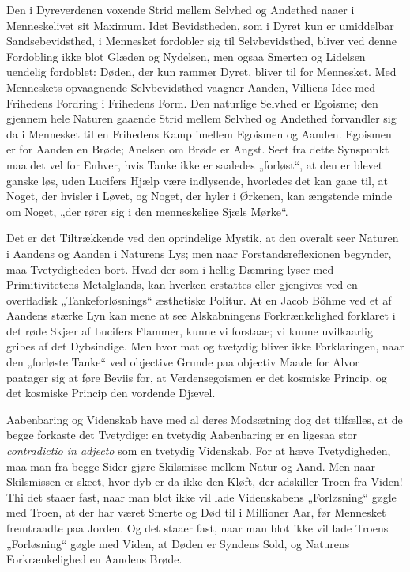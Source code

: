 \documentclass[12pt]{book}
\newcommand{\opage}[1]{\marginnote{\footnotesize\textit{[#1]}}}
\begin{document}
Den i Dyreverdenen voxende Strid mellem Selvhed og Andethed naaer i Menneskelivet sit Maximum. Idet Bevidstheden, som i Dyret kun er umiddelbar Sandsebevidsthed, i Mennesket fordobler sig til Selvbevidsthed, bliver ved denne Fordobling ikke blot Glæden og Nydelsen, men ogsaa Smerten og Lidelsen uendelig fordoblet: Døden, der kun rammer Dyret, bliver til for Mennesket. Med Menneskets opvaagnende Selvbevidsthed vaagner Aanden, Villiens Idee med Frihedens Fordring i Frihedens Form. Den naturlige Selvhed er Egoisme; den gjennem hele Naturen gaaende Strid mellem Selvhed og Andethed forvandler sig da i Mennesket til en Frihedens Kamp imellem Egoismen og Aanden. Egoismen er for Aanden en Brøde; Anelsen om Brøde er Angst. Seet fra dette Synspunkt maa det vel for Enhver, hvis Tanke ikke er saaledes „forløst“, at den er blevet ganske løs, uden Lucifers Hjælp være indlysende, hvorledes det kan gaae til, at Noget, der hvisler i Løvet, og Noget, der hyler i Ørkenen, kan ængstende minde om Noget, „der rører sig i den menneskelige Sjæls Mørke“.

Det er det Tiltrækkende ved den oprindelige Mystik, at den overalt seer Naturen i Aandens og Aanden i Naturens Lys; men naar Forstandsreflexionen begynder, maa Tvetydigheden bort. Hvad der som i hellig Dæmring lyser med Primitivitetens Metalglands, kan hverken erstattes eller gjengives ved en overfladisk „Tankeforløsnings“ æsthetiske Politur. At en Jacob Böhme ved et af Aandens stærke Lyn kan mene at see Alskabningens Forkrænkelighed forklaret i det røde Skjær af Lucifers Flammer, kunne vi forstaae; vi kunne uvilkaarlig gribes af det Dybsindige. Men hvor mat og tvetydig bliver ikke Forklaringen, naar den „forløste Tanke“ ved objective Grunde paa objectiv Maade for Alvor paatager sig at føre
\opage{456}Beviis for, at Verdensegoismen er det kosmiske Princip, og det kosmiske Princip den vordende Djævel.

Aabenbaring og Videnskab have med al deres Modsætning dog det tilfælles, at de begge forkaste det Tvetydige: en tvetydig Aabenbaring er en ligesaa stor \textit{contradictio in adjecto} som en tvetydig Videnskab. For at hæve Tvetydigheden, maa man fra begge Sider gjøre Skilsmisse mellem Natur og Aand. Men naar Skilsmissen er skeet, hvor dyb er da ikke den Kløft, der adskiller Troen fra Viden! Thi det staaer fast, naar man blot ikke vil lade Videnskabens „Forløsning“ gøgle med Troen, at der har været Smerte og Død til i Millioner Aar, før Mennesket fremtraadte paa Jorden. Og det staaer fast, naar man blot ikke vil lade Troens „Forløsning“ gøgle med Viden, at Døden er Syndens Sold, og Naturens Forkrænkelighed en Aandens Brøde.
\end{document}
